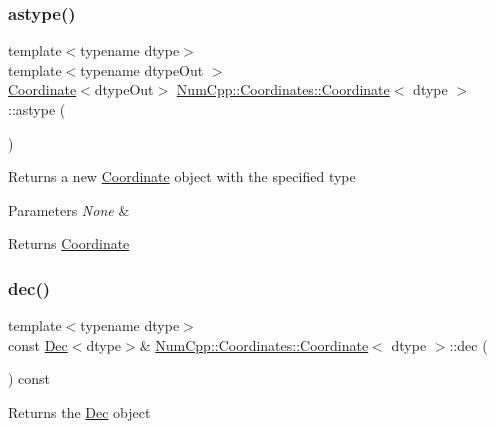 \subsubsection{\texorpdfstring{astype()}{astype()}}
{\footnotesize\ttfamily template$<$typename dtype$>$ \\
template$<$typename dtype\+Out $>$ \\
\mbox{\hyperlink{class_num_cpp_1_1_coordinates_1_1_coordinate}{Coordinate}}$<$dtype\+Out$>$ \mbox{\hyperlink{class_num_cpp_1_1_coordinates_1_1_coordinate}{Num\+Cpp\+::\+Coordinates\+::\+Coordinate}}$<$ dtype $>$\+::astype (\begin{DoxyParamCaption}{ }\end{DoxyParamCaption})\hspace{0.3cm}{\ttfamily [inline]}}

Returns a new \mbox{\hyperlink{class_num_cpp_1_1_coordinates_1_1_coordinate}{Coordinate}} object with the specified type


\begin{DoxyParams}{Parameters}
{\em None} & \\
\hline
\end{DoxyParams}
\begin{DoxyReturn}{Returns}
\mbox{\hyperlink{class_num_cpp_1_1_coordinates_1_1_coordinate}{Coordinate}} 
\end{DoxyReturn}
\mbox{\label{class_num_cpp_1_1_coordinates_1_1_coordinate_a3366db15458260cfc4f44330d0fc27bc}} 
\subsubsection{\texorpdfstring{dec()}{dec()}}
{\footnotesize\ttfamily template$<$typename dtype$>$ \\
const \mbox{\hyperlink{class_num_cpp_1_1_coordinates_1_1_dec}{Dec}}$<$dtype$>$\& \mbox{\hyperlink{class_num_cpp_1_1_coordinates_1_1_coordinate}{Num\+Cpp\+::\+Coordinates\+::\+Coordinate}}$<$ dtype $>$\+::dec (\begin{DoxyParamCaption}{ }\end{DoxyParamCaption}) const\hspace{0.3cm}{\ttfamily [inline]}}

Returns the \mbox{\hyperlink{class_num_cpp_1_1_coordinates_1_1_dec}{Dec}} object


